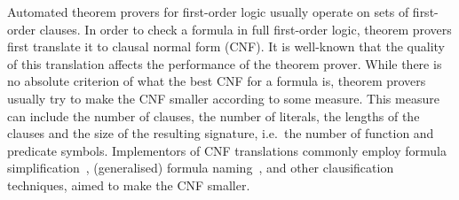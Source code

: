 


%
%
%

Automated theorem provers for first-order logic usually operate on sets of first-order clauses. In order to check a formula in full first-order logic, theorem provers first translate it to clausal normal form (CNF). It is well-known that the quality of this translation affects the performance of the theorem prover. While there is no absolute criterion of what the best CNF for a formula is, theorem provers usually try to make the CNF smaller according to some measure. This measure can include the number of clauses, the number of literals, the lengths of the clauses and the size of the resulting signature, i.e.~the number of function and predicate symbols. Implementors of CNF translations commonly employ formula simplification~\cite{nonnengart2001computing}, (generalised) formula naming~\cite{nonnengart2001computing,azmy2013computing}, and other clausification techniques, aimed to make the CNF smaller.

